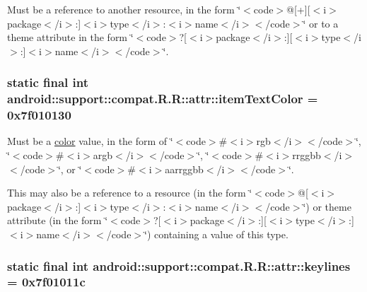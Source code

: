Must be a reference to another resource, in the form \char`\"{}$<$code$>$@\mbox{[}+\mbox{]}\mbox{[}$<$i$>$package$<$/i$>$:\mbox{]}$<$i$>$type$<$/i$>$:$<$i$>$name$<$/i$>$$<$/code$>$\char`\"{} or to a theme attribute in the form \char`\"{}$<$code$>$?\mbox{[}$<$i$>$package$<$/i$>$:\mbox{]}\mbox{[}$<$i$>$type$<$/i$>$:\mbox{]}$<$i$>$name$<$/i$>$$<$/code$>$\char`\"{}. \hypertarget{classandroid_1_1support_1_1compat_1_1_r_1_1attr_830c2b609e45e7f53c5110caccd4d0b4}{
\subsubsection[{itemTextColor}]{\setlength{\rightskip}{0pt plus 5cm}static final int android::support::compat.R.R::attr::itemTextColor = 0x7f010130}}
\label{classandroid_1_1support_1_1compat_1_1_r_1_1attr_830c2b609e45e7f53c5110caccd4d0b4}


Must be a \hyperlink{classandroid_1_1support_1_1compat_1_1_r_1_1color}{color} value, in the form of \char`\"{}$<$code$>$\#$<$i$>$rgb$<$/i$>$$<$/code$>$\char`\"{}, \char`\"{}$<$code$>$\#$<$i$>$argb$<$/i$>$$<$/code$>$\char`\"{}, \char`\"{}$<$code$>$\#$<$i$>$rrggbb$<$/i$>$$<$/code$>$\char`\"{}, or \char`\"{}$<$code$>$\#$<$i$>$aarrggbb$<$/i$>$$<$/code$>$\char`\"{}. 

This may also be a reference to a resource (in the form \char`\"{}$<$code$>$@\mbox{[}$<$i$>$package$<$/i$>$:\mbox{]}$<$i$>$type$<$/i$>$:$<$i$>$name$<$/i$>$$<$/code$>$\char`\"{}) or theme attribute (in the form \char`\"{}$<$code$>$?\mbox{[}$<$i$>$package$<$/i$>$:\mbox{]}\mbox{[}$<$i$>$type$<$/i$>$:\mbox{]}$<$i$>$name$<$/i$>$$<$/code$>$\char`\"{}) containing a value of this type. \hypertarget{classandroid_1_1support_1_1compat_1_1_r_1_1attr_b5c79260c49c7dabe6d2044d004d4895}{
\subsubsection[{keylines}]{\setlength{\rightskip}{0pt plus 5cm}static final int android::support::compat.R.R::attr::keylines = 0x7f01011c}}
\label{classandroid_1_1support_1_1compat_1_1_r_1_1attr_b5c79260c49c7dabe6d2044d004d4895}


